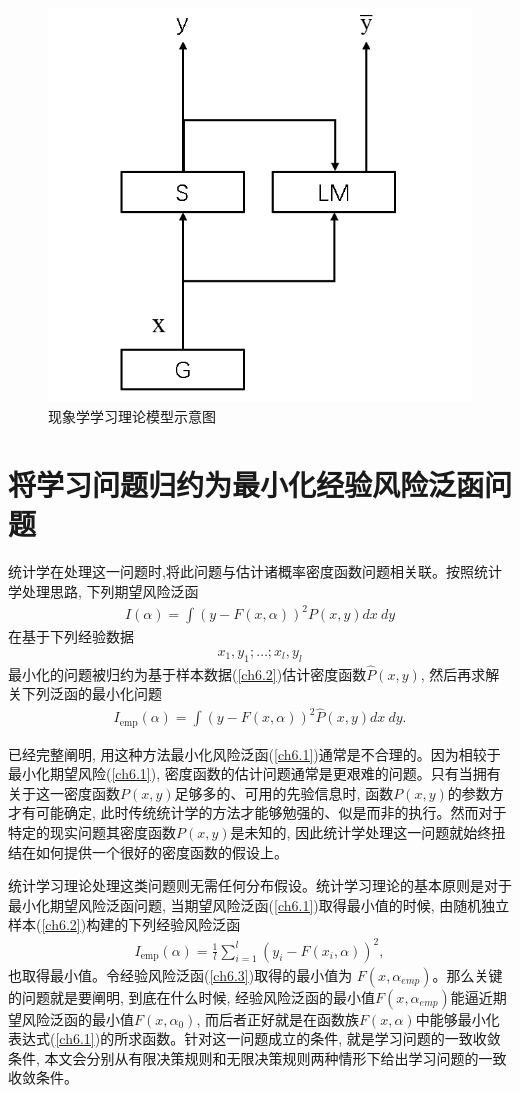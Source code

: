 \begin{figure}
\centering
\includegraphics[width=.4\linewidth]{Img/chapter1/power-right.png}
\caption{现象学学习理论模型示意图}
\label{fig:power-right}
\end{figure}

\section{将学习问题归约为最小化经验风险泛函问题}
统计学在处理这一问题时,将此问题与估计诸概率密度函数问题相关联。按照统计学处理思路, 下列期望风险泛函
\begin{align}\label{ch6.1}
I(\alpha)=\int(y-F(x, \alpha))^{2} P(x, y) d x ~d y
\end{align}
在基于下列经验数据
\begin{align}\label{ch6.2}
x_{1}, y_{1} ; \ldots ; x_{l}, y_{l}
\end{align}
最小化的问题被归约为基于样本数据(\ref{ch6.2})估计密度函数$\hat{P}(x,y)$, 然后再求解关下列泛函的最小化问题
\begin{align}
I_{\mathrm{emp}}(\alpha)=\int(y-F(x, \alpha))^{2} \hat{P}(x, y) d x ~d y.
\end{align}

\citet{vapnik1982}已经完整阐明, 用这种方法最小化风险泛函(\ref{ch6.1})通常是不合理的。因为相较于最小化期望风险(\ref{ch6.1}), 密度函数的估计问题通常是更艰难的问题。只有当拥有关于这一密度函数$P(x,y)$足够多的、可用的先验信息时, 函数$P(x,y)$的参数方才有可能确定, 此时传统统计学的方法才能够勉强的、似是而非的执行\citep{Vapnik2006}。然而对于特定的现实问题其密度函数$P(x,y)$是未知的, 因此统计学处理这一问题就始终扭结在如何提供一个很好的密度函数的假设上。

统计学习理论处理这类问题则无需任何分布假设。统计学习理论的基本原则是对于最小化期望风险泛函问题, 当期望风险泛函(\ref{ch6.1})取得最小值的时候, 由随机独立样本(\ref{ch6.2})构建的下列经验风险泛函
\begin{align}\label{ch6.3}
I_{\mathrm{emp}}(\alpha)=\frac{1}{l} \sum_{i=1}^{l}\left(y_{i}-F\left(x_{i}, \alpha\right)\right)^{2},
\end{align}
也取得最小值。令经验风险泛函(\ref{ch6.3})取得的最小值为 $F(x,\alpha_{emp})$。那么关键的问题就是要阐明, 到底在什么时候, 经验风险泛函的最小值$F(x,\alpha_{emp})$能逼近期望风险泛函的最小值$F(x,\alpha_0)$, 而后者正好就是在函数族$F(x,\alpha)$中能够最小化表达式(\ref{ch6.1})的所求函数。针对这一问题成立的条件, 就是学习问题的一致收敛条件, 本文会分别从有限决策规则和无限决策规则两种情形下给出学习问题的一致收敛条件。

